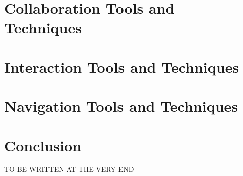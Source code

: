 \documentclass{vgtc}                          %
\begin{document}
\section{Collaboration Tools and Techniques}
\section{Interaction Tools and Techniques}
\section{Navigation Tools and Techniques}

\section{Conclusion}
TO BE WRITTEN AT THE VERY END

\printbibliography
\end{document}
